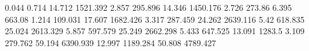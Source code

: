 0.044      0.714      %
14.712     1521.392   %
2.857      295.896    %
14.346     1450.176   %
2.726      273.86     %
6.395      663.08     %
1.214      109.031    %
17.607     1682.426   %
3.317      287.459    %
24.262     2639.116   %
5.42       618.835    %
25.024     2613.329   %
5.857      597.579    %
25.249     2662.298   %
5.433      647.525    %
13.091     1283.5     %
3.109      279.762    %
59.194     6390.939   %
12.997     1189.284   %
50.808     4789.427   %
